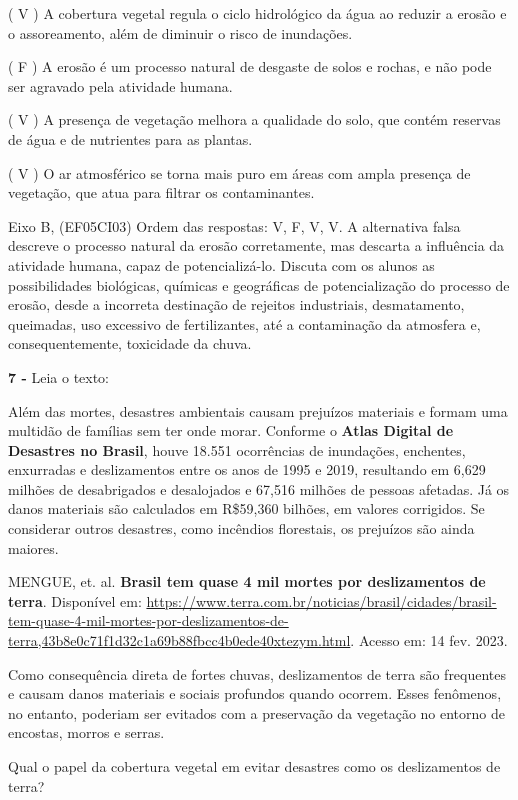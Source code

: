 ( V ) A cobertura vegetal regula o ciclo hidrológico da água ao reduzir
a erosão e o assoreamento, além de diminuir o risco de inundações.

( F ) A erosão é um processo natural de desgaste de solos e rochas, e
não pode ser agravado pela atividade humana.

( V ) A presença de vegetação melhora a qualidade do solo, que contém
reservas de água e de nutrientes para as plantas.

( V ) O ar atmosférico se torna mais puro em áreas com ampla presença de
vegetação, que atua para filtrar os contaminantes.

Eixo B, (EF05CI03) Ordem das respostas: V, F, V, V. A alternativa falsa
descreve o processo natural da erosão corretamente, mas descarta a
influência da atividade humana, capaz de potencializá-lo. Discuta com os
alunos as possibilidades biológicas, químicas e geográficas de
potencialização do processo de erosão, desde a incorreta destinação de
rejeitos industriais, desmatamento, queimadas, uso excessivo de
fertilizantes, até a contaminação da atmosfera e, consequentemente,
toxicidade da chuva.

\textbf{7 -} Leia o texto:

Além das mortes, desastres ambientais causam prejuízos materiais e
formam uma multidão de famílias sem ter onde morar. Conforme o
\textbf{Atlas Digital de Desastres no Brasil}, houve 18.551 ocorrências
de inundações, enchentes, enxurradas e deslizamentos entre os anos de
1995 e 2019, resultando em 6,629 milhões de desabrigados e desalojados e
67,516 milhões de pessoas afetadas. Já os danos materiais são calculados
em R\$59,360 bilhões, em valores corrigidos. Se considerar outros
desastres, como incêndios florestais, os prejuízos são ainda maiores.

MENGUE, et. al. \textbf{Brasil tem quase 4 mil mortes por deslizamentos
de terra}. Disponível em:
\url{https://www.terra.com.br/noticias/brasil/cidades/brasil-tem-quase-4-mil-mortes-por-deslizamentos-de-terra,43b8e0c71f1d32c1a69b88fbcc4b0ede40xtezym.html}.
Acesso em: 14 fev. 2023.

Como consequência direta de fortes chuvas, deslizamentos de terra são
frequentes e causam danos materiais e sociais profundos quando ocorrem.
Esses fenômenos, no entanto, poderiam ser evitados com a preservação da
vegetação no entorno de encostas, morros e serras.

Qual o papel da cobertura vegetal em evitar desastres como os
deslizamentos de terra?

